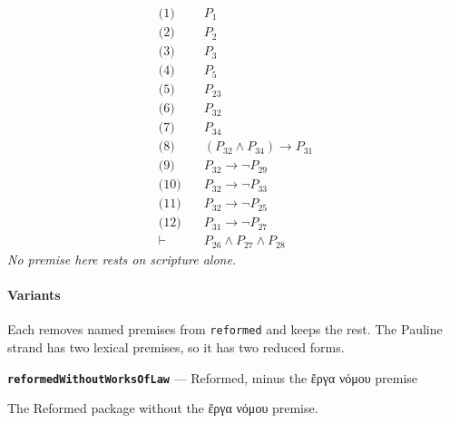 \documentclass[11pt]{article}
\begin{document}
\begin{align*}
  \text{(1)} \quad & P_{1} \\
  \text{(2)} \quad & P_{2} \\
  \text{(3)} \quad & P_{3} \\
  \text{(4)} \quad & P_{5} \\
  \text{(5)} \quad & P_{23} \\
  \text{(6)} \quad & P_{32} \\
  \text{(7)} \quad & P_{34} \\
  \text{(8)} \quad & (P_{32} \land P_{34}) \rightarrow P_{31} \\
  \text{(9)} \quad & P_{32} \rightarrow \lnot P_{29} \\
  \text{(10)} \quad & P_{32} \rightarrow \lnot P_{33} \\
  \text{(11)} \quad & P_{32} \rightarrow \lnot P_{25} \\
  \text{(12)} \quad & P_{31} \rightarrow \lnot P_{27} \\
  \vdash \quad & P_{26} \land P_{27} \land P_{28}
\end{align*}
\emph{No premise here rests on scripture alone.}
\paragraph*{Variants}
\leavevmode\par
Each removes named premises from \texttt{reformed} and keeps the rest. The Pauline strand has two lexical premises, so it has two reduced forms.

\par\medskip\noindent\textbf{\texttt{reformed\allowbreak{}Without\allowbreak{}Works\allowbreak{}Of\allowbreak{}Law}} --- Reformed, minus the ἔργα νόμου premise\par\nobreak\noindent
The Reformed package without the ἔργα νόμου premise.
\end{document}
